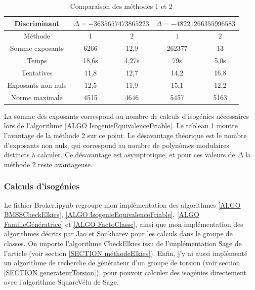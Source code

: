 \begin{table}[h]
	\begin{center}
		\begin{tabular}{|c|cc|cc|}
			\hline
			Discriminant & \multicolumn{2}{c|}{$\Delta = -3635657473865223$} & \multicolumn{2}{c|}{$\Delta = -48221266355996583$}  \\
			\hline
			Méthode & 1 & 2 & 1 & 2 \\
			\hline
			Somme exposants & 6266 & 12,9 & 262377 & 13 \\
			\hline
			Temps & 18,6s & 4,27s & 79s & 5,0s \\
			\hline
			Tentatives & 11,8 & 12,7 & 14,2 & 16,8 \\
			\hline
			Exposants non nuls & 12,5 & 11,9 & 15,1 & 12,2 \\
			\hline
			Norme maximale & 4515 & 4646 & 5457 & 5163 \\
			\hline
		\end{tabular}
	\end{center}
	\caption{Comparaison des méthodes 1 et 2}
	\label{tableauexp}
\end{table}

La somme des exposants correspond au nombre de calculs d'isogénies nécessaires lors de l'algorithme \ref{ALGO IsogenieEquivalenceFriable}. Le tableau \ref{tableauexp} montre l'avantage de la méthode 2 sur ce point. Le désavantage théorique est le nombre d'exposants non nuls, qui correspond au nombre de polynômes modulaires distincts à calculer. Ce désavantage est asymptotique, et pour ces valeurs de $\Delta$ la méthode 2 reste avantageuse.


\subsubsection{Calculs d'isogénies}

Le fichier Broker.ipynb \cite{GITHUBRapportStage} regroupe mon implémentation des algorithmes \ref{ALGO BMSSCheckElkies}, \ref{ALGO IsogenieEquivalenceFriable}, \ref{ALGO FamilleGénératrice} et \ref{ALGO FactoClasse}, ainsi que mon implémentation des algorithmes décrits par Jao et Soukharev \cite{JaoSoukharev} pour les calculs dans le groupe de classes. On importe l'algorithme CheckElkies issu de l'implémentation Sage de l'article \cite{Pegasis} (voir section \ref{SECTION méthodeElkies}). Enfin, j'y ai aussi implémenté un algorithme de recherche de générateur d'un groupe de torsion (voir section \ref{SECTION generateurTorsion}), pour pouvoir calculer des isogénies directement avec l'algorithme SquareVélu de Sage. 

